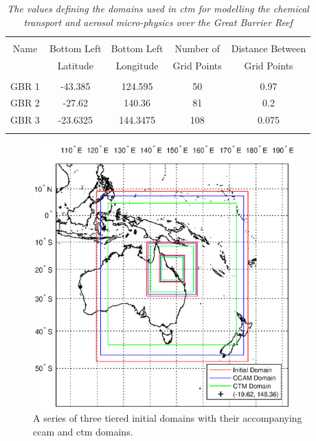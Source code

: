 \begin{table}[tbh!]
	\caption{\textsl{The values defining the domains used in \gls{ctm} for modelling the chemical transport and aerosol micro-physics over the Great Barrier Reef}}
	\centering
		\begin{tabular}{c c c c c} \\
			\hline \\ [-1ex]
			Name & Bottom Left & Bottom Left & Number of & Distance Between \\
			& Latitude & Longitude & Grid Points & Grid Points \\ [1ex]
			\hline \\ [-1ex]
			GBR 1 & -43.385 & 124.595 & 50 & 0.97 \\ 
 			GBR 2 & -27.62 & 140.36 & 81 & 0.2 \\
 			GBR 3 & -23.6325 & 144.3475 & 108 & 0.075 \\ [1ex]
			\hline \\
		\end{tabular}
	\label{tab:ctmdomain}
\end{table}

\begin{figure}[!htb]
    \centering
    \includegraphics[width=0.9\textwidth]{Fig/Research/Domains.eps}
    \caption{A series of three tiered initial domains with their accompanying \gls{ccam} and \gls{ctm} domains.}
    \label{fig:domains}
\end{figure}

